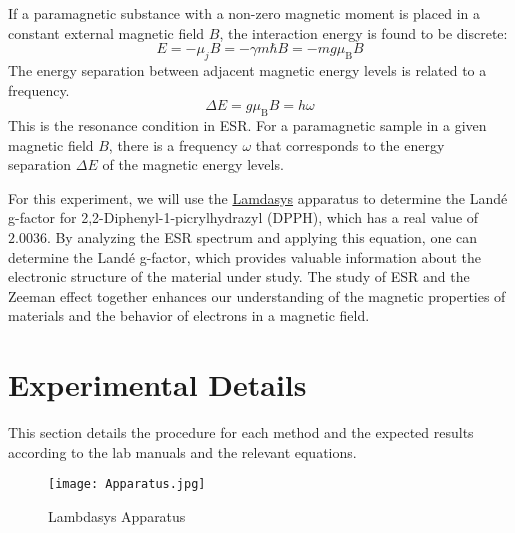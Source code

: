 \documentclass[11pt]{article}
\begin{document}
	If a paramagnetic substance with a non-zero magnetic moment is placed in a constant external magnetic field $B$, the interaction energy is found to be discrete:
	\begin{equation}
		E = - \mu_j B = -\gamma m \hbar B = -mg \mu_\mathrm{B} B \label{eq:4}
	\end{equation}
	The energy separation between adjacent magnetic energy levels is related to a frequency.
	\begin{equation}
		\Delta E = g \mu_\mathrm{B} B = h \omega \label{eq:5}
	\end{equation}
	This is the resonance condition in ESR. For a paramagnetic sample in a given magnetic field $B$, there is a frequency $\omega$ that corresponds to the energy separation $\Delta E$ of the magnetic energy levels.
	
	For this experiment, we will use the \href{https://lambdasys.com/products/detail/185}{Lamdasys} apparatus to determine the Landé g-factor for 2,2-Diphenyl-1-picrylhydrazyl (DPPH), which has a real value of $2.0036$. By analyzing the ESR spectrum and applying this equation, one can determine the Landé g-factor, which provides valuable information about the electronic structure of the material under study. The study of ESR and the Zeeman effect together enhances our understanding of the magnetic properties of materials and the behavior of electrons in a magnetic field.
	
	\clearpage
	
	\section{Experimental Details}
	
	This section details the procedure for each method and the expected results according to the lab manuals and the relevant equations.
	
	\begin{figure}[htbp]
		\centering
		\caption{Lambdasys Apparatus}
		\texttt{[image: Apparatus.jpg]}
	\end{figure}
	
\end{document}
